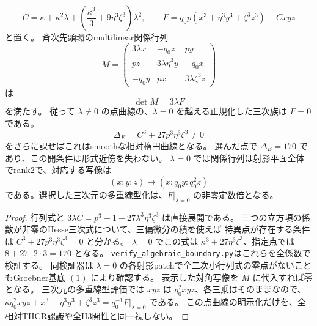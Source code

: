 \begin{proposition}[正規化した楕円曲線の明示式]\label{prop:algebraic-boundary-cubic}
\[
 C=\kappa+\kappa^2\lambda+
       \left(\frac{\kappa^3}{3}+9\eta^3\zeta^3\right)\lambda^2,
 \qquad
 F=q_0p(x^3+\eta^3y^3+\zeta^3z^3)+Cxyz
\]
と置く。
斉次先頭環のmultilinear関係行列
\[
 M=\begin{pmatrix}
 3\lambda x&-q_0z&py\\
 pz&3\lambda\eta^3y&-q_0x\\
 -q_0y&px&3\lambda\zeta^3z
 \end{pmatrix}
\]
は
\[
 \det M=3\lambda F
\]
を満たす。
従って $\lambda\ne0$ の点曲線の、$\lambda=0$ を越える正規化した三次族は $F=0$ である。
\[
 \Delta_E=C^3+27p^3\eta^3\zeta^3\ne0
\]
をさらに課せばこれはsmoothな相対楕円曲線となる。
選んだ点で $\Delta_E=170$ であり、この開条件は形式近傍を失わない。
$\lambda=0$ では関係行列は射影平面全体でrank2で、対応する写像は
\[
 (x:y:z)\longmapsto(x:q_0y:q_0^2z)
\]
である。選択した三次元の多重線型化は、$F|_{\lambda=0}$ の非零定数倍となる。
\end{proposition}
\begin{proof}
行列式と $3\lambda C=p^3-1+27\lambda^3\eta^3\zeta^3$ は直接展開である。
三つの立方項の係数が非零のHesse三次式について、三偏微分の積を使えば
特異点が存在する条件は $C^3+27p^3\eta^3\zeta^3=0$ と分かる。
$\lambda=0$ でこの式は $\kappa^3+27\eta^3\zeta^3$、指定点では $8+27\cdot2\cdot3=170$ となる。
\texttt{verify\_algebraic\_boundary.py}はこれらを全係数で検証する。
同検証器は $\lambda=0$ の各射影patchで全二次小行列式の零点がないこともGroebner基底 $(1)$ により確認する。
表示した対角写像を $M$ に代入すれば零となる。
三次元の多重線型評価では $xyz$ は $q_0^2xyz$、各三乗はそのままなので、
$\kappa q_0^2xyz+x^3+\eta^3y^3+\zeta^3z^3=q_0^{-1}F|_{\lambda=0}$ である。
この点曲線の明示化だけを、全相対THCR認識や全H3開性と同一視しない。
\end{proof}
